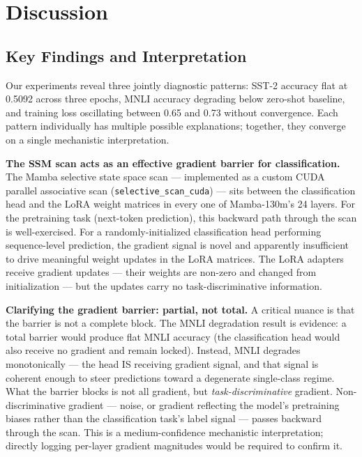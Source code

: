 \section{Discussion}
\label{sec:discussion}

\subsection{Key Findings and Interpretation}

Our experiments reveal three jointly diagnostic patterns: SST-2 accuracy flat at 0.5092 across three epochs, MNLI accuracy degrading below zero-shot baseline, and training loss oscillating between 0.65 and 0.73 without convergence. Each pattern individually has multiple possible explanations; together, they converge on a single mechanistic interpretation.

\textbf{The SSM scan acts as an effective gradient barrier for classification.} The Mamba selective state space scan --- implemented as a custom CUDA parallel associative scan (\texttt{selective\_scan\_cuda}) --- sits between the classification head and the LoRA weight matrices in every one of Mamba-130m's 24 layers. For the pretraining task (next-token prediction), this backward path through the scan is well-exercised. For a randomly-initialized classification head performing sequence-level prediction, the gradient signal is novel and apparently insufficient to drive meaningful weight updates in the LoRA matrices. The LoRA adapters receive gradient updates --- their weights are non-zero and changed from initialization --- but the updates carry no task-discriminative information.

\textbf{Clarifying the gradient barrier: partial, not total.} A critical nuance is that the barrier is not a complete block. The MNLI degradation result is evidence: a total barrier would produce flat MNLI accuracy (the classification head would also receive no gradient and remain locked). Instead, MNLI degrades monotonically --- the head IS receiving gradient signal, and that signal is coherent enough to steer predictions toward a degenerate single-class regime. What the barrier blocks is not all gradient, but \emph{task-discriminative} gradient. Non-discriminative gradient --- noise, or gradient reflecting the model's pretraining biases rather than the classification task's label signal --- passes backward through the scan. This is a medium-confidence mechanistic interpretation; directly logging per-layer gradient magnitudes would be required to confirm it.

